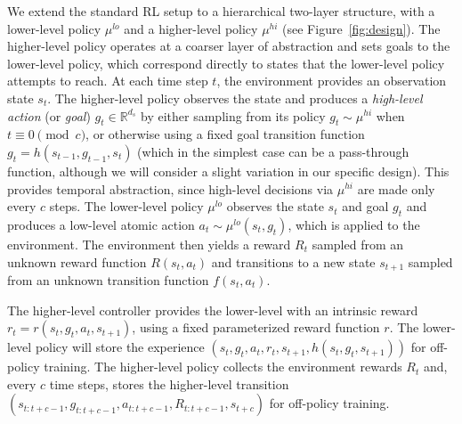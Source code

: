 \documentclass{article}
\begin{document}
We extend the standard RL setup to a hierarchical two-layer structure,
with a lower-level policy $\mu^{lo}$ and a higher-level policy $\mu^{hi}$ (see Figure~\ref{fig:design}).
The higher-level policy operates at a coarser layer of abstraction and sets goals to the lower-level policy, which correspond directly to states that the lower-level policy attempts to reach.
At each time step $t$, the environment provides an observation state $s_t$.
The higher-level policy observes the state and produces a {\em high-level action} (or {\em goal})
$g_t\in\mathbb{R}^{d_s}$ by either sampling from its policy
$g_t\sim\mu^{hi}$ when $t \equiv 0 \pmod{c}$, 
or otherwise using a fixed goal transition function $g_t = h(s_{t-1}, g_{t-1}, s_t)$ (which in the simplest case can be a pass-through function, although we will consider a slight variation in our specific design). 
This provides temporal abstraction, since high-level decisions via $\mu^{hi}$ are made only every $c$ steps.
The lower-level policy $\mu^{lo}$ observes the state $s_t$ and goal $g_t$ and 
produces a low-level atomic action $a_t\sim\mu^{lo}(s_t, g_t)$, which is applied to the environment.
The environment then yields a reward $R_t$ sampled from an unknown reward function $R(s_t, a_t)$
and transitions to a new state $s_{t+1}$ sampled from an unknown transition function $f(s_t, a_t)$.

The higher-level controller provides the lower-level with an intrinsic reward $r_t=r(s_t, g_t, a_t, s_{t+1})$,
using a fixed parameterized reward function $r$.
The lower-level policy will store the experience $(s_t, g_t, a_t, r_t, s_{t+1}, h(s_t, g_t, s_{t+1}))$
for off-policy training.
The higher-level policy collects the environment rewards $R_t$ and, every $c$ time steps,
stores the higher-level transition $(s_{t:t+c-1}, g_{t:t+c-1}, a_{t:t+c-1}, R_{t:t+c-1}, s_{t+c})$
for off-policy training.

\end{document}

